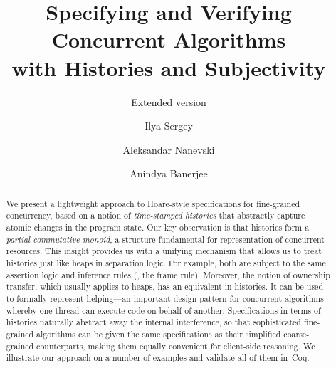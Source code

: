 \documentclass[runningheads]{llncs}
\newcommand{\mytitle}{Specifying and Verifying Concurrent
  Algorithms \\
with Histories and Subjectivity}
\begin{document}
 

\setlength{\pdfpageheight}{\paperheight}
\setlength{\pdfpagewidth}{\paperwidth}

\subtitle{Extended version}

%

\author{Ilya Sergey \and 
  Aleksandar Nanevski \and
  Anindya Banerjee}


\title{\mytitle}

\maketitle 

\begin{abstract}

  We present a lightweight approach to Hoare-style specifications for
  fine-grained concurrency, based on a notion of \emph{time-stamped
    histories} that abstractly capture atomic changes in the program
  state.
% 
Our key observation is that histories form a \emph{partial commutative
  monoid}, a structure fundamental for representation of concurrent
resources.
%
This insight provides us with a unifying mechanism that allows us to
treat histories just like heaps in separation logic. For example, both
are subject to the same assertion logic and inference rules (\eg, the
frame rule). Moreover, the notion of ownership transfer, which usually
applies to heaps, has an equivalent in histories. It can be used to
formally represent helping---an important design pattern for
concurrent algorithms whereby one thread can execute code on behalf of
another.
%
Specifications in terms of histories naturally abstract away the
internal interference, so that sophisticated fine-grained algorithms
can be given the same specifications as their simplified
coarse-grained counterparts, making them equally convenient for
client-side reasoning.
% 
We illustrate our approach on a number of examples and validate all of
them in~Coq.
  
\end{abstract}











 





\newpage
\appendix

\end{document}

